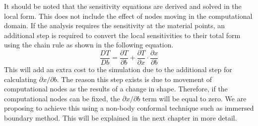 %
It should be noted that the sensitivity equations are derived and solved in the local form. This does not include the effect of nodes moving in the computational domain. If the analysis requires the sensitivity at the material points, an additional step is required to convert the local sensitivities to their total form using the chain rule as shown in the following equation.
%
\begin{equation*}
    \frac{DT}{Db} = \frac{\partial T}{\partial b} + \frac{\partial T}{\partial x} \cdot \frac{\partial x}{\partial b}
\end{equation*}
%
This will add an extra cost to the simulation due to the additional step for calculating $\partial x/\partial b$. The reason this step exists is due to movement of computational nodes as the results of a change in shape. Therefore, if the computational nodes can be fixed, the $\partial x/\partial b$ term will be equal to zero. We are proposing to achieve this using a non-body conformal technique such as immersed boundary method. This will be explained in the next chapter in more detail.
